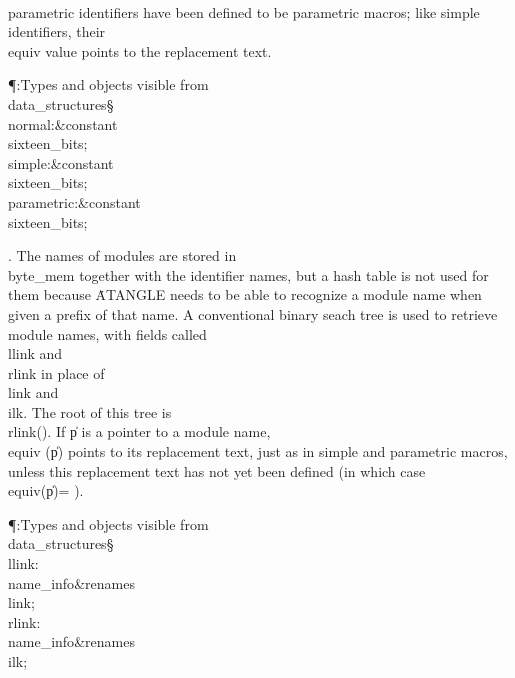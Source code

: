 \yskip\hang \\{parametric} identifiers have been defined to be parametric
macros; like simple identifiers, their \\{equiv} value points to the
replacement text.

\Y\P\?\4:Types and objects visible from \\{data\_structures}\X\mathrel{+}\S%
\?\6
\\{normal}\?:\?\&{constant}\8\\{sixteen\_bits}\?\K{};\6
\\{simple}\?:\?\&{constant}\8\\{sixteen\_bits}\?\K{};\6
\\{parametric}\?:\?\&{constant}\8\\{sixteen\_bits}\?\K{};\par
\fi

. The names of modules are stored in \\{byte\_mem} together with the
identifier
names, but a hash table is not used for them because \.{ATANGLE} needs to be
able to recognize a module name when given a prefix of that name. A
conventional binary seach tree is used to retrieve module names, with fields
called \\{llink} and \\{rlink} in place of \\{link} and \\{ilk}. The root of
this
tree is \\{rlink}\?(\?)\?. If \|p is a pointer to a module name, \\{equiv}%
\?(\?\|p\?)\? points
to its replacement text, just as in simple and parametric macros, unless this
replacement text has not yet been defined (in which case \\{equiv}\?(\?\|p\?)=%
).

\Y\P\?\4:Types and objects visible from \\{data\_structures}\X\mathrel{+}\S%
\?\6
\\{llink}\?:\?\\{name\_info}\8\&{renames}\8\\{link};\6
\\{rlink}\?:\?\\{name\_info}\8\&{renames}\8\\{ilk};\par
\fi

